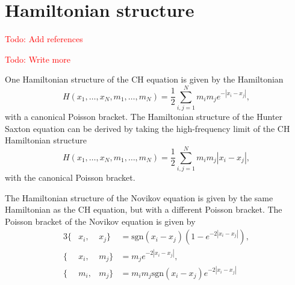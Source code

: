 \documentclass[english,master]{liumaiex}
\theoremstyle{plain}
\theoremstyle{definition}
\newcommand\todo[1]{\textcolor{red}{#1}}
\newcommand{\sgn}{\text{sgn}}
\begin{document}
\begin{center}
\end{center}

\section{Hamiltonian structure}
\todo{Todo: Add references}

\todo{Todo: Write more}

One Hamiltonian structure of the CH equation is given by the Hamiltonian
\begin{equation}
	H(x_1, \dots, x_N, m_1, \dots, m_N) = \frac{1}{2} \sum_{i,j = 1}^{N} m_i m_j e^{-|x_i - x_j|},
\end{equation}
with a canonical Poisson bracket. The Hamiltonian structure of the Hunter Saxton equation can be derived by taking the high-frequency limit of the CH Hamiltonian structure
\begin{equation}
	H(x_1, \dots, x_N, m_1, \dots, m_N) = \frac{1}{2} \sum_{i,j = 1}^{N} m_i m_j |x_i - x_j|,
\end{equation}
with the canonical Poisson bracket.

The Hamiltonian structure of the Novikov equation is given by the same Hamiltonian as the CH equation, but with a different Poisson bracket. The Poisson bracket of the Novikov equation is given by
\begin{alignat}{3}
	\{&x_i, &x_j\} &= \sgn(x_i - x_j)(1 - e^{-2|x_i - x_j|}), \\
	\{&x_i, &m_j\} &= m_j e^{-2|x_i - x_j|}, \\
	\{&m_i, &m_j\} &= m_i m_j \sgn(x_i - x_j)e^{-2|x_i - x_j|}
\end{alignat}
\end{document}
